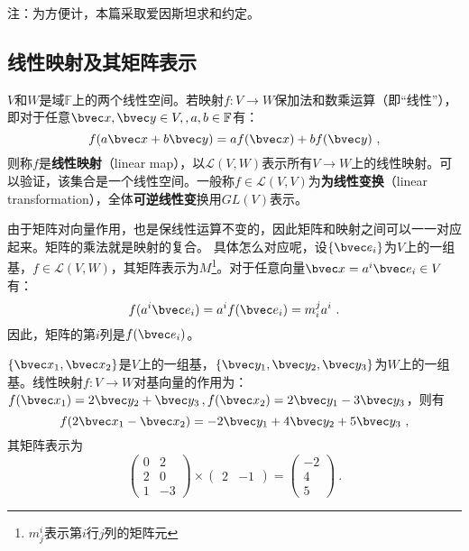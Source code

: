
\begin{issues}
\issueDraft
\end{issues}
注：为方便计，本篇采取爱因斯坦求和约定。
\subsection{线性映射及其矩阵表示}
$V$和$W$是域$\mathbb F$上的两个线性空间。若映射$f:V\rightarrow W$保加法和数乘运算（即“线性”），即对于任意$\bvec x,\bvec y \in V,,a,b\in\mathbb F$有：
\begin{equation}
f(a\bvec x+b\bvec y)=af(\bvec x)+bf(\bvec y)
~,\end{equation}
则称$f$是\textbf{线性映射}（linear map），以$\mathcal L(V,W)$表示所有$V\rightarrow W$上的线性映射。可以验证，该集合是一个线性空间。一般称$f\in \mathcal L(V,V)$为\textbf{为线性变换}（linear transformation），全体\textbf{可逆线性变}换用$GL(V)$表示。

由于矩阵对向量作用，也是保线性运算不变的，因此矩阵和映射之间可以一一对应起来。矩阵的乘法就是映射的复合。
具体怎么对应呢，设$\{\bvec e_i\}$为$V$上的一组基，$f\in\mathcal L(V,W)$，其矩阵表示为$M$\footnote{$m^i_j$表示第$i$行$j$列的矩阵元}。对于任意向量$\bvec x=a^i\bvec e_i\in V$有：
\begin{equation}
f(a^i\bvec e_i)=a^if(\bvec e_i)=m^j_i a^i~.
\end{equation}
因此，矩阵的第$i$列是$f(\bvec e_i)$。
\begin{example}{}
$\{\bvec x_1,\bvec x_2\}$是$V$上的一组基，$\{\bvec y_1,\bvec y_2,\bvec y_3\}$为$W$上的一组基。线性映射$f:V\rightarrow W$对基向量的作用为：$f(\bvec x_1)=2\bvec y_2+\bvec y_3\,,f(\bvec x_2)=2\bvec y_1-3\bvec y_3$，则有
\begin{equation}
f(2\bvec  x_1-\bvec x_2)=-2\bvec y_1+4\bvec y_2+5\bvec y_3~,
\end{equation}其矩阵表示为
\begin{equation}
\begin{pmatrix}
  0& 2\\
  2& 0\\
 1 &-3
\end{pmatrix}\times \begin{pmatrix}
 2 &-1
\end{pmatrix}=\begin{pmatrix}
-2 \\
 4\\
5
\end{pmatrix}~.
\end{equation}
\end{example}
